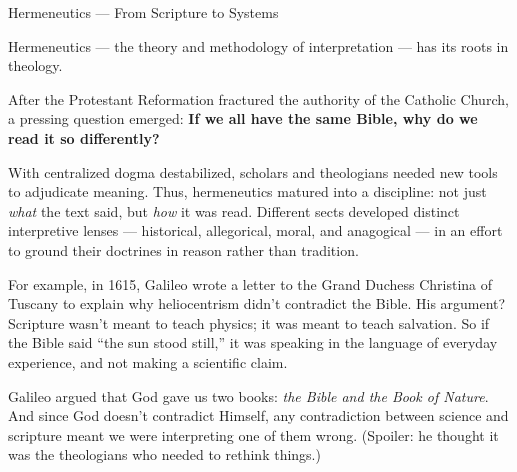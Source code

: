 \begin{PhilosophicalSidebar}{Hermeneutics --- From Scripture to Systems}

    Hermeneutics — the theory and methodology of interpretation — has its roots in theology.
    
    \medskip
    
    After the Protestant Reformation fractured the authority of the Catholic Church, a pressing question emerged:  
    \textbf{If we all have the same Bible, why do we read it so differently?}
    
    \medskip
    
    With centralized dogma destabilized, scholars and theologians needed new tools to adjudicate meaning. Thus, 
    hermeneutics matured into a discipline: not just \textit{what} the text said, but \textit{how} it was read.  
    Different sects developed distinct interpretive lenses — historical, allegorical, moral, and anagogical — 
    in an effort to ground their doctrines in reason rather than tradition.


    \medskip

    For example, in 1615, Galileo wrote a letter to the Grand Duchess Christina of Tuscany to explain why 
    heliocentrism didn’t contradict the Bible. His argument? Scripture wasn’t meant to teach physics; it was 
    meant to teach salvation. So if the Bible said “the sun stood still,” it was speaking in the language of 
    everyday experience, and not making a scientific claim. 

    \medskip
  
    Galileo argued that God gave us two books: \emph{the Bible and the Book of Nature}. And since God doesn’t 
    contradict Himself, any contradiction between science and scripture meant we were interpreting one of 
    them wrong. (Spoiler: he thought it was the theologians who needed to rethink things.)
  
    \medskip
  

\end{PhilosophicalSidebar}

